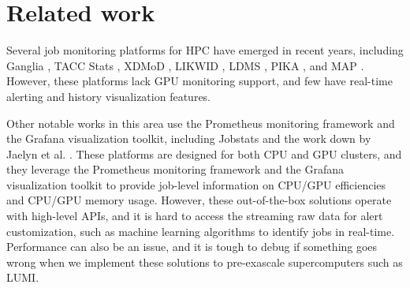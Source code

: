 \section{Related work}

Several job monitoring platforms for HPC have emerged in recent years, including Ganglia \cite{MASSIE2004817}, TACC Stats \cite{7081222}, XDMoD \cite{7106398}, LIKWID \cite{8049016}, LDMS \cite{10.1145/3225058.3225086}, PIKA \cite{9229636}, and MAP \cite{9229613,9556031}. However, these platforms lack GPU monitoring support, and few have real-time alerting and history visualization features.

Other notable works in this area use the Prometheus monitoring framework and the Grafana visualization toolkit, including Jobstats \cite{10.1145/3569951.3604396} and the work down by Jaelyn et al. \cite{10.1145/3569951.3597554}. These platforms are designed for both CPU and GPU clusters, and they leverage the Prometheus monitoring framework \cite{208870} and the Grafana visualization toolkit \cite{Chakraborty2021} to provide job-level information on CPU/GPU efficiencies and CPU/GPU memory usage. However, these out-of-the-box solutions operate with high-level APIs, and it is hard to access the streaming raw data for alert customization, such as machine learning algorithms to identify jobs in real-time. Performance can also be an issue, and it is tough to debug if something goes wrong when we implement these solutions to pre-exascale supercomputers such as LUMI.

